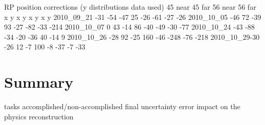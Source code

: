 								
RP position corrections (y distributions data used)								
	45 near		45 far		56 near		56 far	
	x	y	x	y	x	y	x	y
2010_09_21	-31	-54	-47	25	-26	-61	-27	-26
2010_10_05	-46	72	-39	93	-27	-82	-33	-214
2010_10_07	0	43	-14	86	-40	-49	-30	-77
2010_10_24	-43	-88	-34	-20	-36	40	-14	9
2010_10_26	-28	92	-25	160	-46	-248	-76	-218
2010_10_29-30	-26	12	-7	100	-8	-37	-7	-33
\fi


\section[al sum]{Summary}

\> tasks accomplished/non-accomplished
\> final uncertainty
\> error impact on the physics reconstruction
